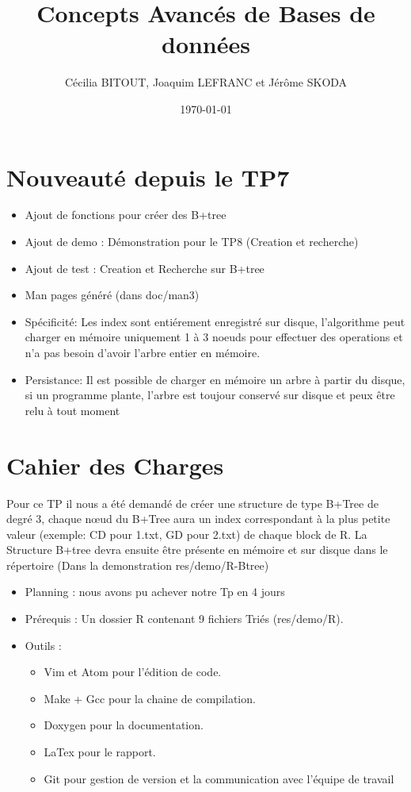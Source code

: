 \documentclass[a4paper]{article}
\title{Concepts Avancés de Bases de données}
\author{Cécilia BITOUT, Joaquim LEFRANC et Jérôme SKODA}
\date{\today}
\begin{document}
\maketitle

\section{Nouveauté depuis le TP7}

\begin{itemize}
  \item Ajout de fonctions pour créer des B+tree
  \item Ajout de demo : Démonstration pour le TP8 (Creation et recherche)
  \item Ajout de test : Creation et Recherche sur B+tree
  \item Man pages généré (dans doc/man3)
  \item Spécificité: Les index sont entiérement enregistré sur disque,
    l'algorithme peut charger en mémoire uniquement 1 à 3 noeuds pour effectuer
    des operations et n'a pas besoin d'avoir l'arbre entier en mémoire.
  \item Persistance: Il est possible de charger en mémoire un arbre à partir du disque,
    si un programme plante, l'arbre est toujour conservé sur disque et peux être relu à tout moment
\end{itemize}

\section{Cahier des Charges}

Pour ce TP il nous a été demandé de créer une structure de type B+Tree
de degré 3, chaque nœud du B+Tree aura un index correspondant à la plus petite
valeur (exemple: CD pour 1.txt, GD pour 2.txt) de chaque block de R.
La Structure B+tree devra ensuite être présente en mémoire et sur disque dans le
répertoire (Dans la demonstration res/demo/R-Btree)

\begin{itemize}
  \item Planning : nous avons pu achever notre Tp en 4 jours
  \item Prérequis : Un dossier R contenant 9 fichiers Triés (res/demo/R).
  \item Outils :
  \begin{itemize}
    \item Vim et Atom pour l’édition de code.
    \item Make + Gcc pour la chaine de compilation.
    \item Doxygen pour la documentation.
    \item LaTex pour le rapport.
    \item Git pour gestion de version et la communication avec l’équipe de travail
  \end{itemize}
\end{itemize}
\end{document}
